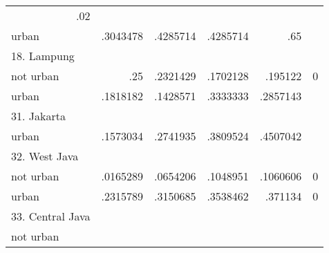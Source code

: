 \begin{table}[!h]
\begin{tabular}{llllll}
  \multicolumn{1}{r}{.02} &
  \multicolumn{1}{r}{} \\
\multicolumn{1}{l}{\hspace{1em}urban} &
  \multicolumn{1}{|r}{.3043478} &
  \multicolumn{1}{r}{.4285714} &
  \multicolumn{1}{r}{.4285714} &
  \multicolumn{1}{r}{.65} &
  \multicolumn{1}{r}{} \\
\multicolumn{1}{l}{18. Lampung} &
  \multicolumn{1}{|r}{} &
  \multicolumn{1}{r}{} &
  \multicolumn{1}{r}{} &
  \multicolumn{1}{r}{} &
  \multicolumn{1}{r}{} \\
\multicolumn{1}{l}{\hspace{1em}not urban} &
  \multicolumn{1}{|r}{.25} &
  \multicolumn{1}{r}{.2321429} &
  \multicolumn{1}{r}{.1702128} &
  \multicolumn{1}{r}{.195122} &
  \multicolumn{1}{r}{0} \\
\multicolumn{1}{l}{\hspace{1em}urban} &
  \multicolumn{1}{|r}{.1818182} &
  \multicolumn{1}{r}{.1428571} &
  \multicolumn{1}{r}{.3333333} &
  \multicolumn{1}{r}{.2857143} &
  \multicolumn{1}{r}{} \\
\multicolumn{1}{l}{31. Jakarta} &
  \multicolumn{1}{|r}{} &
  \multicolumn{1}{r}{} &
  \multicolumn{1}{r}{} &
  \multicolumn{1}{r}{} &
  \multicolumn{1}{r}{} \\
\multicolumn{1}{l}{\hspace{1em}urban} &
  \multicolumn{1}{|r}{.1573034} &
  \multicolumn{1}{r}{.2741935} &
  \multicolumn{1}{r}{.3809524} &
  \multicolumn{1}{r}{.4507042} &
  \multicolumn{1}{r}{} \\
\multicolumn{1}{l}{32. West Java} &
  \multicolumn{1}{|r}{} &
  \multicolumn{1}{r}{} &
  \multicolumn{1}{r}{} &
  \multicolumn{1}{r}{} &
  \multicolumn{1}{r}{} \\
\multicolumn{1}{l}{\hspace{1em}not urban} &
  \multicolumn{1}{|r}{.0165289} &
  \multicolumn{1}{r}{.0654206} &
  \multicolumn{1}{r}{.1048951} &
  \multicolumn{1}{r}{.1060606} &
  \multicolumn{1}{r}{0} \\
\multicolumn{1}{l}{\hspace{1em}urban} &
  \multicolumn{1}{|r}{.2315789} &
  \multicolumn{1}{r}{.3150685} &
  \multicolumn{1}{r}{.3538462} &
  \multicolumn{1}{r}{.371134} &
  \multicolumn{1}{r}{0} \\
\multicolumn{1}{l}{33. Central Java} &
  \multicolumn{1}{|r}{} &
  \multicolumn{1}{r}{} &
  \multicolumn{1}{r}{} &
  \multicolumn{1}{r}{} &
  \multicolumn{1}{r}{} \\
\multicolumn{1}{l}{\hspace{1em}not urban} &

\end{tabular}
\end{table}
